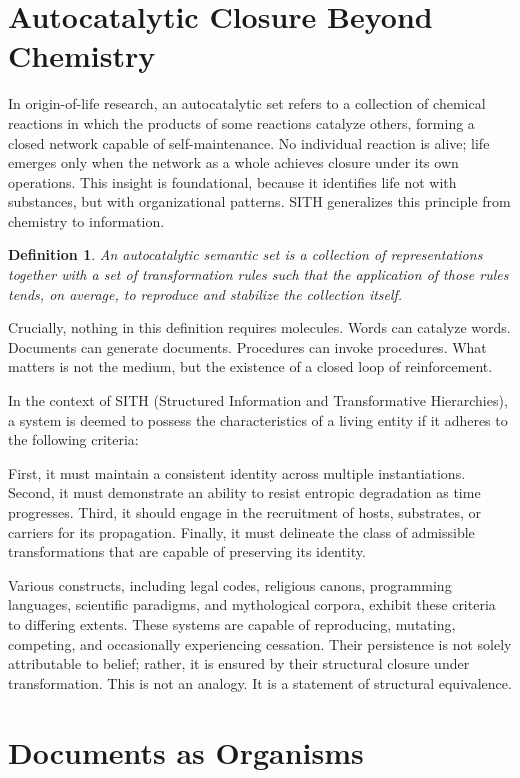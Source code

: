 \documentclass[11pt,oneside]{article}
\newtheorem{definition}{Definition}
\begin{document}
\section{Autocatalytic Closure Beyond Chemistry}

In origin-of-life research, an autocatalytic set refers to a collection of chemical reactions in which the products of some reactions catalyze others, forming a closed network capable of self-maintenance. No individual reaction is alive; life emerges only when the network as a whole achieves closure under its own operations. This insight is foundational, because it identifies life not with substances, but with organizational patterns.
SITH generalizes this principle from chemistry to information.
\begin{definition} An \emph{autocatalytic semantic set} is a collection of representations together with a set of transformation rules such that the application of those rules tends, on average, to reproduce and stabilize the collection itself. \end{definition}
Crucially, nothing in this definition requires molecules. Words can catalyze words. Documents can generate documents. Procedures can invoke procedures. What matters is not the medium, but the existence of a closed loop of reinforcement.

In the context of SITH (Structured Information and Transformative Hierarchies), a system is deemed to possess the characteristics of a living entity if it adheres to the following criteria: 

First, it must maintain a consistent identity across multiple instantiations. Second, it must demonstrate an ability to resist entropic degradation as time progresses. Third, it should engage in the recruitment of hosts, substrates, or carriers for its propagation. Finally, it must delineate the class of admissible transformations that are capable of preserving its identity.

Various constructs, including legal codes, religious canons, programming languages, scientific paradigms, and mythological corpora, exhibit these criteria to differing extents. These systems are capable of reproducing, mutating, competing, and occasionally experiencing cessation. Their persistence is not solely attributable to belief; rather, it is ensured by their structural closure under transformation. This is not an analogy. It is a statement of structural equivalence.

\section{Documents as Organisms}
\end{document}
